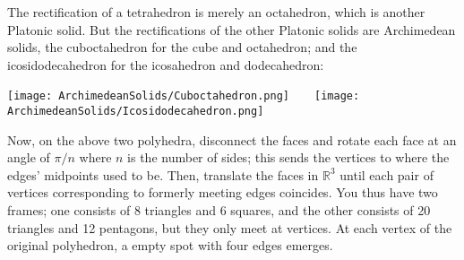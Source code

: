 \documentclass[leqno]{book}
\begin{document}
The rectification of a tetrahedron is merely an octahedron, which is another Platonic solid.  But the rectifications of the other Platonic solids are Archimedean solids, the cuboctahedron for the cube and octahedron; and the icosidodecahedron for the icosahedron and dodecahedron:
\begin{center}
\texttt{[image: ArchimedeanSolids/Cuboctahedron.png]}~~~~\texttt{[image: ArchimedeanSolids/Icosidodecahedron.png]}
\end{center}
Now, on the above two polyhedra, disconnect the faces and rotate each face at an angle of $\pi/n$ where $n$ is the number of sides; this sends the vertices to where the edges' midpoints used to be.  Then, translate the faces in $\mathbb R^3$ until each pair of vertices corresponding to formerly meeting edges coincides.  You thus have two frames; one consists of 8 triangles and 6 squares, and the other consists of 20 triangles and 12 pentagons, but they only meet at vertices.  At each vertex of the original polyhedron, a empty spot with four edges emerges.
\end{document}
